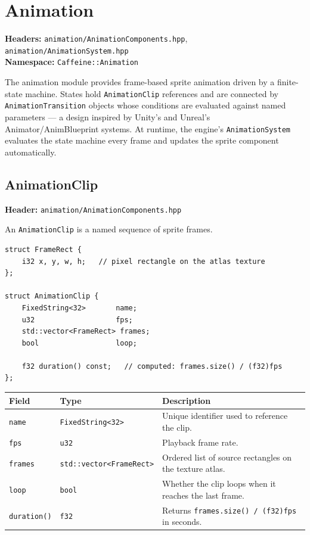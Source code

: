 \chapter{Animation}

\textbf{Headers:} \texttt{animation/AnimationComponents.hpp},
                  \texttt{animation/AnimationSystem.hpp}\\
\textbf{Namespace:} \texttt{Caffeine::Animation}

The animation module provides frame-based sprite animation driven by a
finite-state machine. States hold \texttt{AnimationClip} references and are
connected by \texttt{AnimationTransition} objects whose conditions are
evaluated against named parameters — a design inspired by Unity's and
Unreal's Animator/AnimBlueprint systems. At runtime, the engine's
\texttt{AnimationSystem} evaluates the state machine every frame and updates
the sprite component automatically.

\section{AnimationClip}

\textbf{Header:} \texttt{animation/AnimationComponents.hpp}

An \texttt{AnimationClip} is a named sequence of sprite frames.

\begin{lstlisting}
struct FrameRect {
    i32 x, y, w, h;   // pixel rectangle on the atlas texture
};

struct AnimationClip {
    FixedString<32>       name;
    u32                   fps;
    std::vector<FrameRect> frames;
    bool                  loop;

    f32 duration() const;   // computed: frames.size() / (f32)fps
};
\end{lstlisting}

\begin{longtable}{llp{8cm}}
\toprule
\textbf{Field} & \textbf{Type} & \textbf{Description} \\
\midrule
\texttt{name}     & \texttt{FixedString<32>}          & Unique identifier used to reference the clip. \\
\texttt{fps}      & \texttt{u32}                       & Playback frame rate. \\
\texttt{frames}   & \texttt{std::vector<FrameRect>}    & Ordered list of source rectangles on the texture atlas. \\
\texttt{loop}     & \texttt{bool}                      & Whether the clip loops when it reaches the last frame. \\
\texttt{duration()} & \texttt{f32}                     & Returns \texttt{frames.size() / (f32)fps} in seconds. \\
\bottomrule
\end{longtable}

